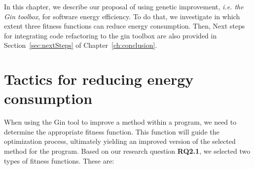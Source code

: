 In this chapter, we describe our proposal of using genetic improvement, \textit{i.e. the Gin toolbox}, for software energy efficiency. To do that, we investigate in which extent three fitness functions can reduce energy consumption.
Then, Next steps for integrating code refactoring to the gin toolbox are also provided in Section~\ref{sec:nextSteps} of Chapter~\ref{ch:conclusion}. %

\section{Tactics for reducing energy consumption}\label{sec:tactics}

When using the Gin tool to improve a method within a program, we need to determine the appropriate fitness function. This function will guide the optimization process, ultimately yielding an improved version of the selected method for the program.
Based on our research question \textbf{RQ2.1}, we selected two types of fitness functions. These are:

  
